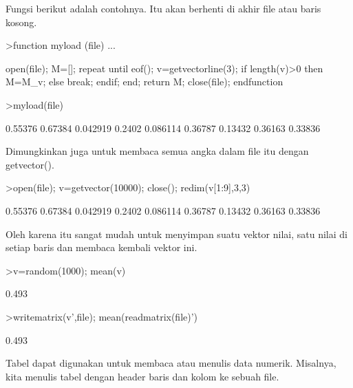 \documentclass{article}
\begin{document}
\begin{eulernotebook}
\begin{eulercomment}
\begin{eulercomment}
\begin{eulercomment}
\begin{eulercomment}
\begin{eulercomment}
\begin{eulercomment}
\begin{eulercomment}
\begin{eulercomment}
\begin{eulercomment}
\begin{eulercomment}
\begin{eulercomment}
\begin{eulercomment}
\begin{eulercomment}
\begin{eulercomment}
\begin{eulercomment}
Fungsi berikut adalah contohnya. Itu akan berhenti di akhir file atau
baris kosong.
\end{eulercomment}
\begin{eulerprompt}
>function myload (file) ...
\end{eulerprompt}
\begin{eulerudf}
  open(file);
  M=[];
  repeat
     until eof();
     v=getvectorline(3);
     if length(v)>0 then M=M_v; else break; endif;
  end;
  return M;
  close(file);
  endfunction
\end{eulerudf}
\begin{eulerprompt}
>myload(file)
\end{eulerprompt}
\begin{euleroutput}
    0.55376   0.67384  0.042919 
     0.2402  0.086114   0.36787 
    0.13432   0.36163   0.33836 
\end{euleroutput}
\begin{eulercomment}
Dimungkinkan juga untuk membaca semua angka dalam file itu dengan
getvector().
\end{eulercomment}
\begin{eulerprompt}
>open(file); v=getvector(10000); close(); redim(v[1:9],3,3)
\end{eulerprompt}
\begin{euleroutput}
    0.55376   0.67384  0.042919 
     0.2402  0.086114   0.36787 
    0.13432   0.36163   0.33836 
\end{euleroutput}
\begin{eulercomment}
Oleh karena itu sangat mudah untuk menyimpan suatu vektor nilai, satu
nilai di setiap baris dan membaca kembali vektor ini.
\end{eulercomment}
\begin{eulerprompt}
>v=random(1000); mean(v)
\end{eulerprompt}
\begin{euleroutput}
  0.493
\end{euleroutput}
\begin{eulerprompt}
>writematrix(v',file); mean(readmatrix(file)')
\end{eulerprompt}
\begin{euleroutput}
  0.493
\end{euleroutput}
\begin{eulercomment}
Tabel dapat digunakan untuk membaca atau menulis data numerik.
Misalnya, kita menulis tabel dengan header baris dan kolom ke sebuah
file.
\end{eulercomment}

\end{eulercomment}
\end{eulercomment}
\end{eulercomment}
\end{eulercomment}
\end{eulercomment}
\end{eulercomment}
\end{eulercomment}
\end{eulercomment}
\end{eulercomment}
\end{eulercomment}
\end{eulercomment}
\end{eulercomment}
\end{eulercomment}
\end{eulercomment}
\end{eulernotebook}
\end{document}
